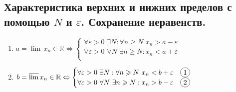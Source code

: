 \subsection{Характеристика верхних и нижних пределов с помощью 
    $N$ и $\varepsilon$. Сохранение неравенств.}
    
    \begin{theorem-non}\end{theorem-non}
    \begin{enumerate}
        \item $a = \underline{\lim}\, x_n \in \mathbb{R} \Leftrightarrow
        \begin{cases}
            \forall \varepsilon > 0 \,\, \exists N : \forall n \geqslant N
            \,\, x_n > a - \varepsilon\\
            \forall \varepsilon > 0 \,\, \forall N \,\, \exists n \geqslant N
            : x_n < a + \varepsilon\\
        \end{cases}$
        \item $b = \overline{\lim}\, x_n \in \mathbb{R} \Leftrightarrow
        \begin{cases}
            \forall \varepsilon > 0 \,\, \exists N : \forall n \geqslant N
            \,\, x_n < b + \varepsilon \quad \circled{1}\\
            \forall \varepsilon > 0 \,\, \forall N \,\, \exists n \geqslant N
            : x_n > b - \varepsilon \quad \circled{2}\\
        \end{cases}$
    \end{enumerate}
